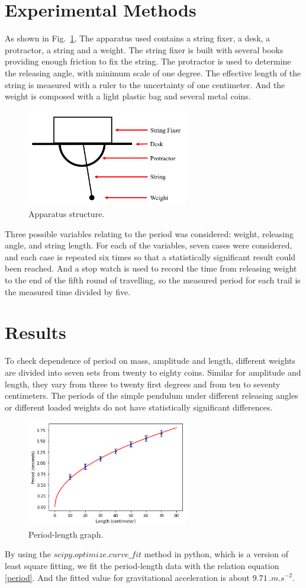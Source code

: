 \documentclass[twocolumn,preprintnumbers,amsmath,amssymb,longbibliography]{revtex4-1}
\begin{document}
\section{Experimental Methods}
As shown in Fig.~\ref{app}, The apparatus used contains a string fixer, a desk, a protractor, a string and a weight. The string fixer is built with several books providing enough friction to fix the string. The protractor is used to determine the releasing angle, with minimum scale of one degree. The effective length of the string is measured with a ruler to the uncertainty of one centimeter. And the weight is composed with a light plastic bag and several metal coins.
\begin{figure}[H]
\centering
\includegraphics[width=7cm]{apparatus.png}
\caption{\label{app} Apparatus structure.} 
\end{figure}
Three possible variables relating to the period was considered: weight, releasing angle, and string length. For each of the variables, seven cases were considered, and each case is repeated six times so that a statistically significant result could been reached. And a stop watch is used to record the time from releasing weight to the end of the fifth round of travelling, so the measured period for each trail is the measured time divided by five.

\section{Results}
To check dependence of period on mass, amplitude and length, different weights are divided into seven sets from twenty to eighty coins. Similar for amplitude and length, they vary from three to twenty first degrees and from ten to seventy centimeters. 
The periods of the simple pendulum under different releasing angles or different loaded weights do not have statistically significant differences.
\begin{figure}[H]
\centering
\includegraphics[width=7cm]{TvL.png}
\caption{\label{tvl} Period-length graph.} 
\end{figure}
By using the $scipy.optimize.curve\_fit$ method in python, which is a version of least square fitting, we fit the period-length data with the relation equation \eqref{period}. And the fitted value for gravitational acceleration is about $9.71\, \si{.m.s^{-2}}$. 
\end{document}
